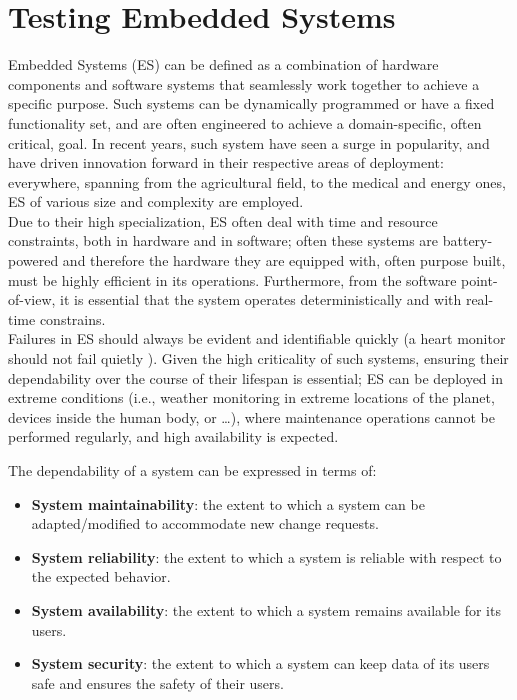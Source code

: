 \section{Testing Embedded Systems}
Embedded Systems (ES) can be defined as a combination of hardware components and software systems that seamlessly work together to achieve a specific purpose. Such systems can be dynamically programmed or have a fixed functionality set, and are often engineered to achieve a domain-specific, often critical, goal.
In recent years, such system have seen a surge in popularity, and have driven innovation forward in their respective areas of deployment: everywhere, spanning from the agricultural field, to the medical and energy ones, ES of various size and complexity are employed. \\
Due to their high specialization, ES often deal with time and resource constraints, both in hardware and in software; often these systems are battery-powered and therefore the hardware they are equipped with, often purpose built, must be highly efficient in its operations. Furthermore, from the software point-of-view, it is essential that the system operates deterministically and with real-time constrains. \\
Failures in ES should always be evident and identifiable quickly (a heart monitor should not fail quietly \cite{MakingEmbeddedSystems}). Given the high criticality of such systems, ensuring their dependability over the course of their lifespan is essential; ES can be deployed in extreme conditions (i.e., weather monitoring in extreme locations of the planet, devices inside the human body, or \dots), where maintenance operations cannot be performed regularly,  and high availability is expected. 

The dependability of a system can be expressed in terms of:
\begin{itemize}
    \item \textbf{System maintainability}: the extent to which a system can be adapted/modified to accommodate new change requests.
    \item \textbf{System reliability}: the extent to which a system is reliable with respect to the expected behavior.
    \item \textbf{System availability}: the extent to which a system remains available for its users.
    \item \textbf{System security}: the extent to which a system can keep data of its users safe and ensures the safety of their users.
\end{itemize}

